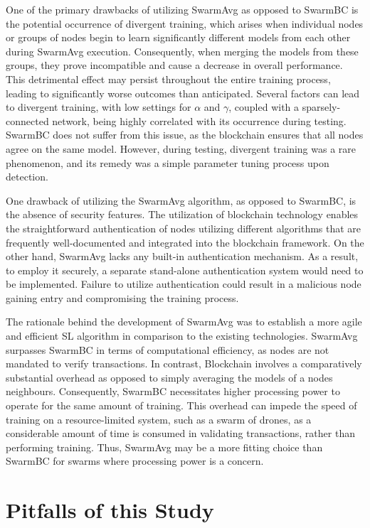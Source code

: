 One of the primary drawbacks of utilizing SwarmAvg as opposed to SwarmBC is the potential occurrence of divergent training, which arises when individual nodes or groups of nodes begin to learn significantly different models from each other during SwarmAvg execution. Consequently, when merging the models from these groups, they prove incompatible and cause a decrease in overall performance. This detrimental effect may persist throughout the entire training process, leading to significantly worse outcomes than anticipated. Several factors can lead to divergent training, with low settings for $\alpha$ and $\gamma$, coupled with a sparsely-connected network, being highly correlated with its occurrence during testing. SwarmBC does not suffer from this issue, as the blockchain ensures that all nodes agree on the same model. However, during testing, divergent training was a rare phenomenon, and its remedy was a simple parameter tuning process upon detection.

One drawback of utilizing the SwarmAvg algorithm, as opposed to SwarmBC, is the absence of security features. The utilization of blockchain technology enables the straightforward authentication of nodes utilizing different algorithms that are frequently well-documented and integrated into the blockchain framework. On the other hand, SwarmAvg lacks any built-in authentication mechanism. As a result, to employ it securely, a separate stand-alone authentication system would need to be implemented. Failure to utilize authentication could result in a malicious node gaining entry and compromising the training process.

The rationale behind the development of SwarmAvg was to establish a more agile and efficient SL algorithm in comparison to the existing technologies. SwarmAvg surpasses SwarmBC in terms of computational efficiency, as nodes are not mandated to verify transactions. In contrast, Blockchain involves a comparatively substantial overhead as opposed to simply averaging the models of a nodes neighbours. Consequently, SwarmBC necessitates higher processing power to operate for the same amount of training. This overhead can impede the speed of training on a resource-limited system, such as a swarm of drones, as a considerable amount of time is consumed in validating transactions, rather than performing training. Thus, SwarmAvg may be a more fitting choice than SwarmBC for swarms where processing power is a concern.

\section{Pitfalls of this Study}

